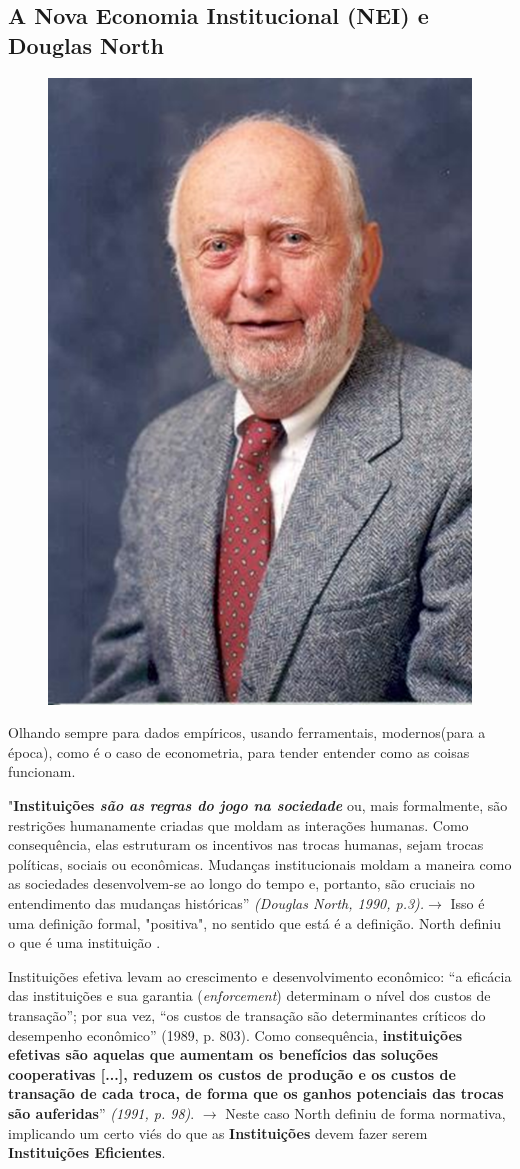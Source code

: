 \documentclass[a4paper,12pt]{article}[abntex2]
\begin{document}
\subsection{\textbf{A Nova Economia Institucional (NEI) e Douglas North}}
\begin{figure}[H]
    \centering
    \includegraphics[width=0.5\linewidth]{Imagens/a2i1.png}
\end{figure}
Olhando sempre para dados empíricos, usando ferramentais, modernos(para a época), como é o caso de econometria, para tender entender como as coisas funcionam.

"\textbf{Instituições \textit{são as regras do jogo na sociedade}} ou, mais formalmente, são restrições humanamente criadas que moldam as interações humanas. Como consequência, elas estruturam os incentivos nas trocas humanas, sejam trocas políticas, sociais ou econômicas. Mudanças institucionais moldam a maneira como as sociedades desenvolvem-se ao longo do tempo e, portanto, são cruciais no entendimento das mudanças históricas” \textit{(Douglas North, 1990, p.3).}$\rightarrow$ Isso é uma definição formal, "positiva", no sentido que está é a definição. North definiu o que é uma instituição .

Instituições efetiva levam ao crescimento e desenvolvimento econômico: “a eficácia das instituições e sua garantia (\textit{enforcement}) determinam o nível dos custos de transação”; por sua vez, “os custos de transação são determinantes críticos do desempenho econômico” (1989, p. 803). Como consequência, \textbf{instituições efetivas são aquelas que aumentam os benefícios das soluções cooperativas [...], reduzem os custos de produção e os custos de transação de cada troca, de forma que os ganhos potenciais das trocas são auferidas}” \textit{(1991, p. 98)}. $\rightarrow$ Neste caso North definiu de forma normativa, implicando um certo viés do que as \textbf{Instituições} devem fazer serem \textbf{Instituições Eficientes}.
\end{document}

